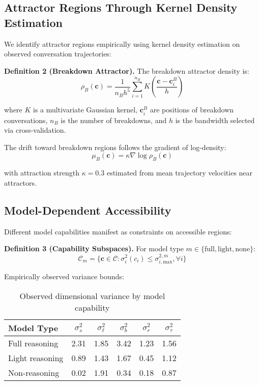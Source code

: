 \documentclass[11pt,letterpaper]{article}
\newcommand{\fullVarianceSocial}{2.31}
\newcommand{\fullVarianceLinguistic}{1.85}
\newcommand{\fullVarianceBreakdown}{3.42}
\newcommand{\fullVarianceRecovery}{1.23}
\newcommand{\fullVarianceTemporal}{1.56}
\newcommand{\lightVarianceSocial}{0.89}
\newcommand{\lightVarianceLinguistic}{1.43}
\newcommand{\lightVarianceBreakdown}{1.67}
\newcommand{\lightVarianceRecovery}{0.45}
\newcommand{\lightVarianceTemporal}{1.12}
\newcommand{\noneVarianceSocial}{0.02}
\newcommand{\noneVarianceLinguistic}{1.91}
\newcommand{\noneVarianceBreakdown}{0.34}
\newcommand{\noneVarianceRecovery}{0.18}
\newcommand{\noneVarianceTemporal}{0.87}
\newcommand{\attractorKappa}{0.3}
\begin{document}
\subsection{Attractor Regions Through Kernel Density Estimation}

We identify attractor regions empirically using kernel density estimation on observed conversation trajectories:

\textbf{Definition 2 (Breakdown Attractor).} The breakdown attractor density is:
\begin{equation}
\rho_B(\mathbf{c}) = \frac{1}{n_B h^5} \sum_{i=1}^{n_B} K\left(\frac{\mathbf{c} - \mathbf{c}_i^B}{h}\right)
\end{equation}

where $K$ is a multivariate Gaussian kernel, $\mathbf{c}_i^B$ are positions of breakdown conversations, $n_B$ is the number of breakdowns, and $h$ is the bandwidth selected via cross-validation.

The drift toward breakdown regions follows the gradient of log-density:
\begin{equation}
\mu_B(\mathbf{c}) = \kappa \nabla \log \rho_B(\mathbf{c})
\end{equation}

with attraction strength $\kappa = \attractorKappa{}$ estimated from mean trajectory velocities near attractors.

\subsection{Model-Dependent Accessibility}

Different model capabilities manifest as constraints on accessible regions:

\textbf{Definition 3 (Capability Subspaces).} For model type $m \in \{\text{full}, \text{light}, \text{none}\}$:
\begin{equation}
\mathcal{C}_m = \{\mathbf{c} \in \mathcal{C} : \sigma_i^2(c_i) \leq \sigma_{i,\text{max}}^{2,m}, \forall i\}
\end{equation}

Empirically observed variance bounds:
\begin{table}[h]
\centering
\begin{tabular}{lccccc}
\toprule
Model Type & $\sigma_s^2$ & $\sigma_\ell^2$ & $\sigma_b^2$ & $\sigma_r^2$ & $\sigma_\tau^2$ \\
\midrule
Full reasoning & \fullVarianceSocial{} & \fullVarianceLinguistic{} & \fullVarianceBreakdown{} & \fullVarianceRecovery{} & \fullVarianceTemporal{} \\
Light reasoning & \lightVarianceSocial{} & \lightVarianceLinguistic{} & \lightVarianceBreakdown{} & \lightVarianceRecovery{} & \lightVarianceTemporal{} \\
Non-reasoning & \noneVarianceSocial{} & \noneVarianceLinguistic{} & \noneVarianceBreakdown{} & \noneVarianceRecovery{} & \noneVarianceTemporal{} \\
\bottomrule
\end{tabular}
\caption{Observed dimensional variance by model capability}
\end{table}
\end{document}
